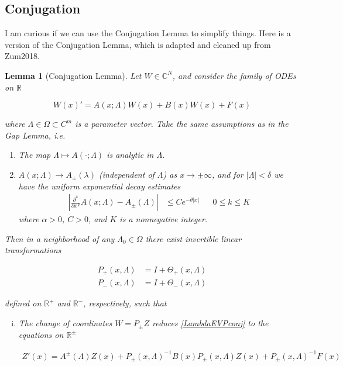 \documentclass[12pt]{article}
\def\R{{\mathbb R}}
\def\C{{\mathbb C}}
\newtheorem{lemma}{Lemma}
\begin{document}
\subsection*{Conjugation}

I am curious if we can use the Conjugation Lemma to simplify things. Here is a version of the Conjugation Lemma, which is adapted and cleaned up from Zum2018. 

\begin{lemma}[Conjugation Lemma]
Let $W \in \C^N$, and consider the family of ODEs on $\R$

\begin{equation}\label{LambdaEVPconj}
W(x)' = A(x; \Lambda) W(x) + B(x) W(x) + F(x) 
\end{equation}

where $\Lambda \in \Omega \subset C^m$ is a parameter vector. Take the same assumptions as in the Gap Lemma, i.e. 

\begin{enumerate}
	\item The map $\Lambda \mapsto A(\cdot; \Lambda)$ is analytic in $\Lambda$.
	\item $A(x; \Lambda) \rightarrow A_\pm(\lambda)$ (independent of $\Lambda$) as $x \rightarrow \pm \infty$, and for $|\Lambda| < \delta$ we have the uniform exponential decay estimates 
	\begin{align}
	\left| \frac{\partial^k}{\partial x^k} A(x; \Lambda) - A_\pm(\Lambda) \right| 
	&\leq C e^{-\theta |x|} && 0 \leq k \leq K
	\end{align}
	where $\alpha > 0$, $C > 0$, and $K$ is a nonnegative integer.
\end{enumerate}

Then in a neighborhood of any $\Lambda_0 \in \Omega$ there exist invertible linear transformations

\begin{align*}
P_+(x, \Lambda) &= I + \Theta_+(x, \Lambda) \\
P_-(x, \Lambda) &= I + \Theta_-(x, \Lambda) 
\end{align*}

defined on $\R^+$ and $\R^-$, respectively, such that

\begin{enumerate}[(i)]
\item The change of coordinates $W = P_\pm Z$ reduces \eqref{LambdaEVPconj} to the equations on $\R^\pm$

\begin{align}
Z'(x) = A^\pm(\Lambda) Z(x) + P_\pm(x, \Lambda)^{-1} B(x) P_\pm(x, \Lambda) Z(x) + P_\pm(x, \Lambda)^{-1} F(x)
\end{align}


\end{enumerate}
\end{lemma}
\end{document}
